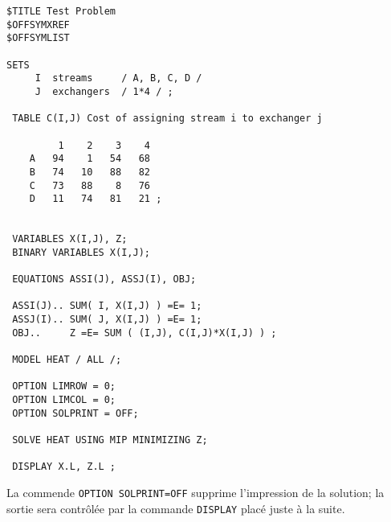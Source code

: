 \begin{example}
\begin{verbatim}
$TITLE Test Problem 
$OFFSYMXREF 
$OFFSYMLIST 

SETS 
     I  streams     / A, B, C, D / 
     J  exchangers  / 1*4 / ; 

 TABLE C(I,J) Cost of assigning stream i to exchanger j 

         1    2    3    4 
    A   94    1   54   68 
    B   74   10   88   82 
    C   73   88    8   76 
    D   11   74   81   21 ; 
 

 VARIABLES X(I,J), Z; 
 BINARY VARIABLES X(I,J); 

 EQUATIONS ASSI(J), ASSJ(I), OBJ; 

 ASSI(J).. SUM( I, X(I,J) ) =E= 1; 
 ASSJ(I).. SUM( J, X(I,J) ) =E= 1; 
 OBJ..     Z =E= SUM ( (I,J), C(I,J)*X(I,J) ) ; 

 MODEL HEAT / ALL /; 

 OPTION LIMROW = 0; 
 OPTION LIMCOL = 0; 
 OPTION SOLPRINT = OFF; 

 SOLVE HEAT USING MIP MINIMIZING Z; 

 DISPLAY X.L, Z.L ;  
 \end{verbatim}
La commende \verb|OPTION SOLPRINT=OFF| supprime l'impression de la solution; la sortie sera contrôlée par la commande \verb|DISPLAY| placé juste à
 la suite.
\end{example}

